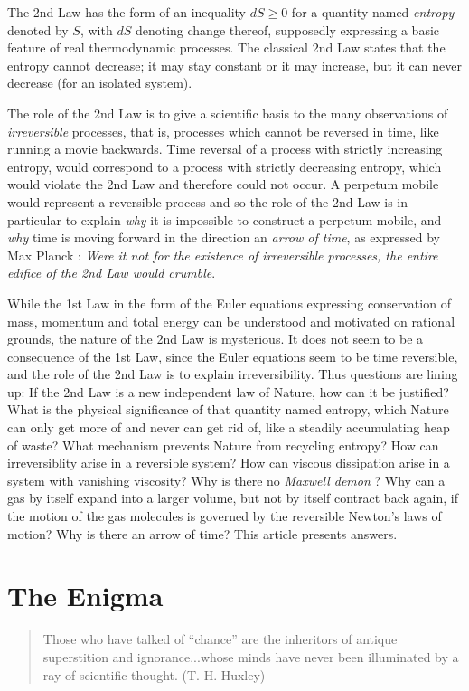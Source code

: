 The 2nd Law has the form of an inequality 
$dS\ge 0$ for a quantity
named \emph{entropy} denoted by
$S$, with $dS$ denoting change thereof, supposedly  
expressing a basic feature of real thermodynamic processes.
The classical 2nd Law states that the entropy cannot decrease; 
it may stay constant or it may increase,
but it can never decrease (for an isolated system). 

The role of the 2nd Law is
to give a scientific basis to the many observations  
of \emph{irreversible} processes, that is, processes which cannot 
be reversed in time, like running a movie backwards. 
Time reversal of a 
process with strictly increasing entropy, would correspond
to a process with strictly 
decreasing entropy, which would violate the 2nd Law and therefore could
not occur. A perpetum mobile would represent a reversible
process and so the role of the 2nd Law is in particular to explain \emph{why}
it is impossible to construct a perpetum mobile, and
\emph{why} time is moving forward in the direction an
\emph{arrow of time}, as expressed by  Max Planck 
\cite{planck1,planck2,planck3}: \emph{Were it not for the 
existence of irreversible processes, the entire edifice
of the 2nd Law would crumble}.

While the 1st Law in the form of the Euler equations
expressing conservation of mass, momentum and total energy
can be understood and motivated on rational grounds, 
the nature of the 2nd Law is mysterious.
It does not seem to be a consequence of the 1st Law, since the Euler
equations seem to be time reversible, and the role of the 2nd Law is to 
explain irreversibility. Thus questions are lining up: If the 2nd Law is a new
independent law of 
Nature, how can it be justified? What is the physical significance of that
quantity named entropy, 
which Nature can only get more of and never can get rid of, like 
a steadily accumulating heap of waste? What mechanism prevents Nature 
from recycling entropy? How can irreversiblity arise in a 
reversible system? How can viscous dissipation arise in a 
system with vanishing viscosity? Why is there no \emph{Maxwell demon}
\cite{maxwell}? 
Why can a gas by itself expand
into a larger volume, but not by itself contract back again,
if the motion of the gas molecules is governed by the reversible Newton's
laws of motion? Why is there an arrow of time? This article presents answers.

  

\section{The Enigma}
\small
\begin{quote}
Those who have talked of ``chance'' are the
inheritors of antique superstition and ignorance...whose minds have never
been illuminated by a ray of scientific thought. (T. H. Huxley)
\end{quote}
\normalsize



